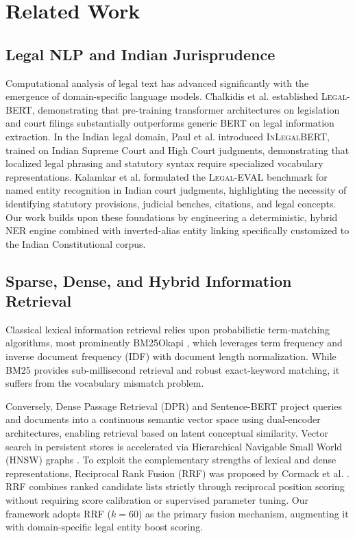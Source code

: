 \documentclass[10pt,twocolumn]{article}
\begin{document}
\section{Related Work}
\label{sec:related_work}

\subsection{Legal NLP and Indian Jurisprudence}
Computational analysis of legal text has advanced significantly with the emergence of domain-specific language models. Chalkidis et al. \cite{chalkidis2020legal} established \textsc{Legal-BERT}, demonstrating that pre-training transformer architectures on legislation and court filings substantially outperforms generic BERT on legal information extraction. In the Indian legal domain, Paul et al. \cite{paul2022pre} introduced \textsc{InLegalBERT}, trained on Indian Supreme Court and High Court judgments, demonstrating that localized legal phrasing and statutory syntax require specialized vocabulary representations. Kalamkar et al. \cite{kalamkar2022named} formulated the \textsc{Legal-EVAL} benchmark for named entity recognition in Indian court judgments, highlighting the necessity of identifying statutory provisions, judicial benches, citations, and legal concepts. Our work builds upon these foundations by engineering a deterministic, hybrid NER engine combined with inverted-alias entity linking specifically customized to the Indian Constitutional corpus.

\subsection{Sparse, Dense, and Hybrid Information Retrieval}
Classical lexical information retrieval relies upon probabilistic term-matching algorithms, most prominently BM25Okapi \cite{robertson1994simple,robertson2009probabilistic}, which leverages term frequency and inverse document frequency (IDF) with document length normalization. While BM25 provides sub-millisecond retrieval and robust exact-keyword matching, it suffers from the vocabulary mismatch problem.

Conversely, Dense Passage Retrieval (DPR) \cite{karpukhin2020dense} and Sentence-BERT \cite{reimers2019sentence} project queries and documents into a continuous semantic vector space using dual-encoder architectures, enabling retrieval based on latent conceptual similarity. Vector search in persistent stores is accelerated via Hierarchical Navigable Small World (HNSW) graphs \cite{malkov2020efficient}. To exploit the complementary strengths of lexical and dense representations, Reciprocal Rank Fusion (RRF) was proposed by Cormack et al. \cite{cormack2009reciprocal}. RRF combines ranked candidate lists strictly through reciprocal position scoring without requiring score calibration or supervised parameter tuning. Our framework adopts RRF ($k=60$) as the primary fusion mechanism, augmenting it with domain-specific legal entity boost scoring.
\end{document}
